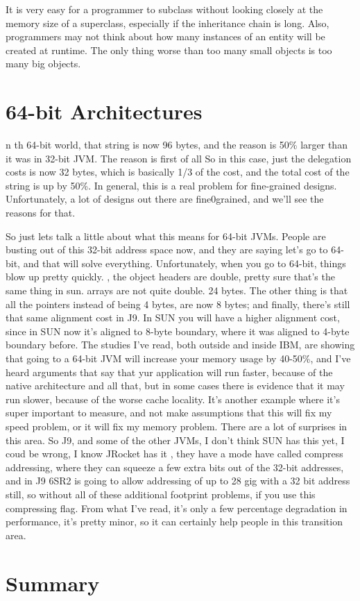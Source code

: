 \documentclass{book}
\theoremstyle{definition}
\begin{document}
It is very easy for a programmer to subclass without looking closely at the memory size of a superclass, especially if the inheritance chain is long. Also, programmers may not think about how many instances of an entity will be created at runtime. The only thing worse than too many small objects is too many big objects. 

\section{64-bit Architectures}

n th 64-bit world, that string is now 96 bytes, and the reason is 50\% larger than it was in 32-bit JVM. The reason is first of all So in this case, just the delegation costs is now 32 bytes, which is basically 1/3 of the cost, and the total cost of the string is up by 50\%.  In general, this is a real problem for fine-grained designs. Unfortunately, a lot of designs out there are fine0grained, and we'll see the reasons for that. 


So just lets talk a little about what this means for 64-bit JVMs. People are busting out of this 32-bit address space now, and they are saying let's go to 64-bit, and that will solve everything. Unfortunately, when you go to 64-bit, things blow up pretty quickly. , the object headers are double, pretty sure that's the same thing in sun. arrays are not quite double. 24 bytes. The other thing is that all the pointers instead of being 4 bytes, are now 8 bytes; and finally, there's still that same alignment cost in J9. In SUN you will have a higher alignment cost, since in SUN now it's aligned to 8-byte boundary, where it was aligned to 4-byte boundary before.  The studies I've read, both outside and inside IBM, are showing that going to a 64-bit JVM will increase your memory usage by 40-50\%, and I've heard arguments that say that yur application will run faster, because of the native architecture and all that,  but in some cases there is evidence that it may run slower, because of the worse cache locality. It's another example where it's super important to measure, and not make assumptions that this will fix my speed problem, or it will fix my memory problem. There are a lot of surprises in this area. So J9, and some of the other JVMs, I don't think SUN has this yet, I coud be wrong, I know JRocket has it , they have a mode have called compress addressing, where they can squeeze a few extra bits out of the 32-bit addresses, and in J9 6SR2 is going to allow addressing of up to 28 gig with a 32 bit address still, so without all of these additional footprint problems, if you use this compressing flag. From what I've read, it's only a few percentage degradation in performance, it's pretty minor, so it can certainly help people in this transition area.




\section{Summary}
\end{document}
